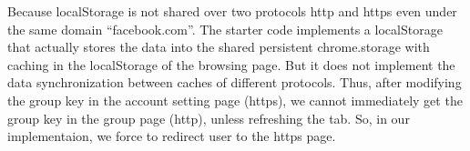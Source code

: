 Because localStorage is not shared over two protocols http and https even under the same domain ``facebook.com''. 
The starter code implements a localStorage that actually stores the data into the shared persistent chrome.storage with caching in the localStorage of the browsing page. But it does not implement the data synchronization between caches of different protocols. Thus, after modifying the group key in the account setting page (https), we cannot immediately get the group key in the group page (http), unless refreshing the tab. So, in our implementaion, we force to redirect user to the https page. 



